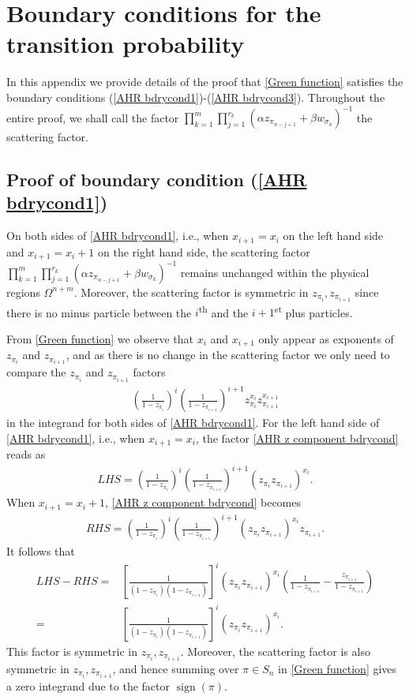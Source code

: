 \documentclass[cmp]{svjour}
\numberwithin{theorem}{section}
\numberwithin{equation}{section}
\DeclareMathOperator{\sign}{sign}
\begin{document}
\section{Boundary conditions for the transition probability}
\label{se:bcs}

In this appendix we provide details of the proof that \eqref{Green function} satisfies the boundary conditions (\ref{AHR bdrycond1})-(\ref{AHR bdrycond3}). Throughout the entire proof, we shall call the factor $\prod_{k=1}^{m}\prod_{j=1}^{r_k}(\alpha z_{\pi_{n-j+1}}+\beta w_{\sigma_k})^{-1}$ the scattering factor.

\subsection{Proof of boundary condition (\ref{AHR bdrycond1})}

On both sides of \eqref{AHR bdrycond1}, i.e., when $x_{i+1}=x_i$ on the left hand side and $x_{i+1}=x_i+1$ on the right hand side, the scattering factor $\prod_{k=1}^{m}\prod_{j=1}^{r_k}(\alpha z_{\pi_{n-j+1}}+\beta w_{\sigma_k})^{-1}$ remains unchanged within the physical regions $\Omega^{n+m}$. Moreover, the scattering factor is symmetric in $z_{\pi_i},z_{\pi_{i+1}}$ since there is no minus particle between the $i$\textsuperscript{th} and the $i+1$\textsuperscript{st} plus particles.

From \eqref{Green function} we observe that $x_i$ and $x_{i+1}$ only appear as exponents of $z_{\pi_i}$ and $z_{\pi_{i+1}}$, and as there is no change in the scattering factor we only need to compare the $z_{\pi_i}$ and $z_{\pi_{i+1}}$ factors
\begin{align}
\label{AHR z component bdrycond}
\left(\frac{1}{1-z_{\pi_i}}\right)^i
\left(\frac{1}{1-z_{\pi_{i+1}}}\right)^{i+1}
z_{\pi_i}^{x_i}z_{\pi_{i+1}}^{x_{i+1}}
\end{align}
in the integrand for both sides of \eqref{AHR bdrycond1}. For the left hand side of \eqref{AHR bdrycond1}, i.e., when $x_{i+1}=x_{i}$, the factor \eqref{AHR z component bdrycond} reads as
\begin{align*}
LHS
=
\left(\frac{1}{1-z_{\pi_i}}\right)^i
\left(\frac{1}{1-z_{\pi_{i+1}}}\right)^{i+1}
(z_{\pi_i}z_{\pi_{i+1}})^{x_i}.
\end{align*}
When $x_{i+1}=x_i+1$, \eqref{AHR z component bdrycond} becomes
\begin{align*}
RHS
=
\left(\frac{1}{1-z_{\pi_i}}\right)^i
\left(\frac{1}{1-z_{\pi_{i+1}}}\right)^{i+1}
(z_{\pi_i}z_{\pi_{i+1}})^{x_i}z_{\pi_{i+1}}.
\end{align*}
It follows that
\begin{align*}
LHS-RHS
=&
\left[\frac{1}{(1-z_{\pi_i})(1-z_{\pi_{i+1}})}\right]^i
(z_{\pi_i}z_{\pi_{i+1}})^{x_i}
\left(
\frac{1}{1-z_{\pi_{i+1}}}-
\frac{z_{\pi_{i+1}}}{1-z_{\pi_{i+1}}}\right)
\\
=&
\left[\frac{1}{(1-z_{\pi_i})(1-z_{\pi_{i+1}})}\right]^i
(z_{\pi_i}z_{\pi_{i+1}})^{x_i}.
\end{align*}
This factor is symmetric in $z_{\pi_i},z_{\pi_{i+1}}$. Moreover, the scattering factor is also symmetric in $z_{\pi_i},z_{\pi_{i+1}}$, and hence summing over $\pi\in S_n$ in \eqref{Green function} gives a zero integrand due to the factor $\sign(\pi)$.
\end{document}
